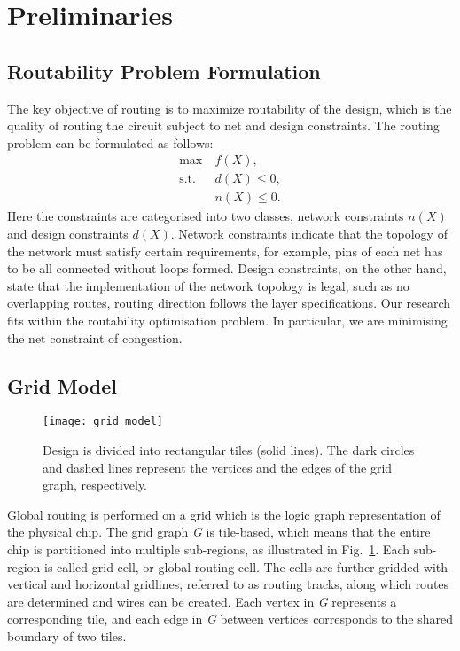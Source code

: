 \section{Preliminaries}
\label{sec:prelim}

\subsection{Routability Problem Formulation}
The key objective of routing is to maximize routability of the design, which is the quality of routing the circuit subject to net and design constraints.
The routing problem can be formulated as follows:
\begin{subequations}
\begin{align}
    \max  \       & f(X), \\
    \text{s.t.}~~  & d(X) \leq 0, \\
                  & n(X) \leq 0.
\end{align}
\end{subequations}
Here the constraints are categorised into two classes, network constraints $n(X)$ and design constraints $d(X)$. Network constraints indicate that the topology of the network must satisfy certain requirements, for example, pins of each net has to be all connected without loops formed. Design constraints, on the other hand, state that the implementation of the network topology is legal, such as no overlapping routes, routing direction follows the layer specifications. Our research fits within the routability optimisation problem. In particular, we are minimising the net constraint of congestion.

\subsection{Grid Model}
\label{subsec:grid model}

\begin{figure}[tb!]
    \centering
    \texttt{[image: grid\_model]}
	\caption{Design is divided into rectangular tiles (solid lines). The dark
		circles and dashed lines represent the vertices and the edges of the grid graph, respectively.}
	\label{fig:grid_model}
\end{figure}

Global routing is performed on a grid which is the logic graph representation of the physical chip. The grid graph \emph{G} is tile-based, which means that the entire chip is partitioned into multiple sub-regions, as illustrated in Fig.~\ref{fig:grid_model}. Each sub-region is called grid cell, or global routing cell. The cells are further gridded with vertical and horizontal gridlines, referred to as routing tracks, along which routes are determined and wires can be created. Each vertex in \emph{G} represents a corresponding tile, and each edge in \emph{G} between vertices corresponds to the shared boundary of two tiles.

